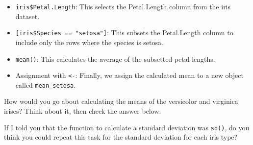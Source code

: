 \documentclass[
  letterpaper,
]{book}
\newenvironment{Shaded}{\begin{snugshade}}{\end{snugshade}}
\newcommand{\FunctionTok}[1]{\textcolor[rgb]{0.28,0.35,0.67}{#1}}
\newcommand{\NormalTok}[1]{\textcolor[rgb]{0.00,0.23,0.31}{#1}}
\newcommand{\OtherTok}[1]{\textcolor[rgb]{0.00,0.23,0.31}{#1}}
\newcommand{\SpecialCharTok}[1]{\textcolor[rgb]{0.37,0.37,0.37}{#1}}
\newcommand{\StringTok}[1]{\textcolor[rgb]{0.13,0.47,0.30}{#1}}
\providecommand{\tightlist}{%
  \setlength{\itemsep}{0pt}\setlength{\parskip}{0pt}}\usepackage{longtable,booktabs,array}
\begin{document}
\begin{itemize}
\tightlist
\item
  \texttt{iris\$Petal.Length}: This selects the Petal.Length column from
  the iris dataset.
\item
  \texttt{{[}iris\$Species\ ==\ "setosa"{]}}: This subsets the
  Petal.Length column to include only the rows where the species is
  setosa.
\item
  \texttt{mean()}: This calculates the average of the subsetted petal
  lengths.
\item
  Assignment with \texttt{\textless{}-}: Finally, we assign the
  calculated mean to a new object called \texttt{mean\_setosa}.
\end{itemize}

How would you go about calculating the means of the versicolor and
virginica irises? Think about it, then check the answer below:

\begin{Shaded}
\end{Shaded}

If I told you that the function to calculate a standard deviation was
\texttt{sd()}, do you think you could repeat this task for the standard
deviation for each iris type?
\end{document}
